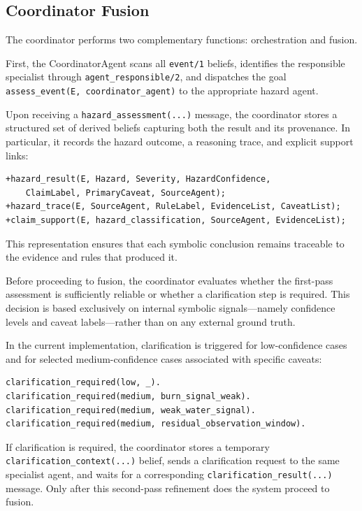 \documentclass[12pt]{article}
\let\oldtexttt\texttt
\renewcommand{\texttt}[1]{{\fontsize{10.5}{12}\selectfont\oldtexttt{#1}}}
\begin{document}
\subsection{Coordinator Fusion}

The coordinator performs two complementary functions: orchestration and fusion.

First, the CoordinatorAgent scans all \texttt{event/1} beliefs, identifies the responsible specialist through \texttt{agent\_responsible/2}, and dispatches the goal \texttt{assess\_event(E, coordinator\_agent)} to the appropriate hazard agent.

Upon receiving a \texttt{hazard\_assessment(...)} message, the coordinator stores a structured set of derived beliefs capturing both the result and its provenance. In particular, it records the hazard outcome, a reasoning trace, and explicit support links:

\begin{lstlisting}
+hazard_result(E, Hazard, Severity, HazardConfidence,
    ClaimLabel, PrimaryCaveat, SourceAgent);
+hazard_trace(E, SourceAgent, RuleLabel, EvidenceList, CaveatList);
+claim_support(E, hazard_classification, SourceAgent, EvidenceList);
\end{lstlisting}

This representation ensures that each symbolic conclusion remains traceable to the evidence and rules that produced it.

Before proceeding to fusion, the coordinator evaluates whether the first-pass assessment is sufficiently reliable or whether a clarification step is required. This decision is based exclusively on internal symbolic signals—namely confidence levels and caveat labels—rather than on any external ground truth.

In the current implementation, clarification is triggered for low-confidence cases and for selected medium-confidence cases associated with specific caveats:

\begin{lstlisting}
clarification_required(low, _).
clarification_required(medium, burn_signal_weak).
clarification_required(medium, weak_water_signal).
clarification_required(medium, residual_observation_window).
\end{lstlisting}

If clarification is required, the coordinator stores a temporary \texttt{clarification\_context(...)} belief, sends a clarification request to the same specialist agent, and waits for a corresponding \texttt{clarification\_result(...)} message. Only after this second-pass refinement does the system proceed to fusion.
\end{document}

